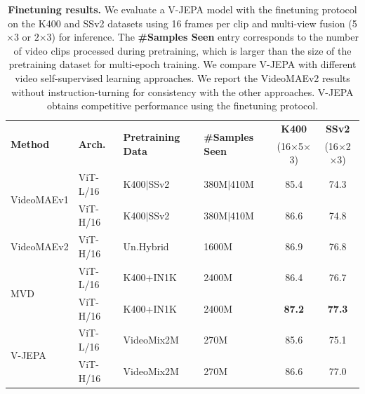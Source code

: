 \documentclass[twocolumn]{fairmeta}
\newcommand{\putalg}{{\small V-JEPA}\xspace}
\theoremstyle{plain}
\theoremstyle{definition}
\theoremstyle{remark}
\begin{document}
\begin{table}[!h]
    \centering
    \caption{\small{\bf Finetuning results.} We evaluate a V-JEPA model with the finetuning protocol on the K400 and SSv2 datasets using 16 frames per clip and multi-view fusion (5$\times$3 or $2$×$3$) for inference. The {\bf \#Samples Seen} entry corresponds to the number of video clips processed during pretraining, which is larger than the size of the pretraining dataset for multi-epoch training. We compare \putalg with different video self-supervised learning approaches.
    We report the VideoMAEv2 results without instruction-turning for consistency with the other approaches. \putalg obtains competitive performance using the finetuning protocol.}
    \label{tab:finetune}
    {\fontsize{8pt}{8pt}\selectfont
    \begin{tabular}{l l l l c c}
        \multirow{2}{*}{\bf Method} & \multirow{2}{*}{\bf Arch.} & \multirow{2}{*}{\bf Pretraining Data} & \multirow{2}{*}{\bf \#Samples Seen } & \bf K400 & \bf SSv2 \\ 
        &  &  &  & {\fontsize{5.5pt}{5.5pt}\selectfont(16$\times$5$\times$3)} & {\fontsize{5.5pt}{5.5pt}\selectfont(16$\times$2$\times$3)}\\
        \toprule
        \multirow{2}{*}{VideoMAEv1} & ViT-L/16 & K400$\lvert$SSv2 & 380M$\lvert$410M & 85.4 & 74.3\\
        &  ViT-H/16 & K400$\lvert$SSv2 & 380M$\lvert$410M & 86.6 & 74.8\\ 
        \multirow{1}{*}{VideoMAEv2} &  ViT-H/16 &  Un.Hybrid & 1600M & 86.9 & 76.8\\
        \multirow{2}{*}{MVD} &  ViT-L/16 &  K400+IN1K & 2400M &  86.4 & 76.7\\
        &  ViT-H/16 &  K400+IN1K & 2400M & \bf 87.2 & \bf 77.3\\
        \midrule
        \multirow{2}{*}{V-JEPA} & ViT-L/16 & VideoMix2M & 270M & 85.6 & 75.1\\
        & ViT-H/16 & VideoMix2M & 270M & 86.6 & 77.0\\
    \end{tabular}}
\end{table}
\end{document}
